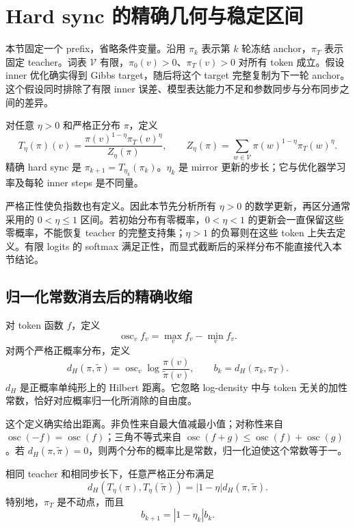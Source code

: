\section{Hard sync 的精确几何与稳定区间}
\label{sec:hard-sync-geometry}

本节固定一个 prefix，省略条件变量。沿用 $\pi_k$ 表示第 $k$ 轮冻结 anchor，$\pi_T$ 表示固定 teacher。词表 $\mathcal V$ 有限，$\pi_0(v)>0$、$\pi_T(v)>0$ 对所有 token 成立。假设 inner 优化确实得到 Gibbs target，随后将这个 target 完整复制为下一轮 anchor。这个假设同时排除了有限 inner 误差、模型表达能力不足和参数同步与分布同步之间的差异。

\begin{definition}
对任意 $\eta>0$ 和严格正分布 $\pi$，定义
\[
 T_\eta(\pi)(v)
 =\frac{\pi(v)^{1-\eta}\pi_T(v)^\eta}{Z_\eta(\pi)},
 \qquad
 Z_\eta(\pi)=\sum_{w\in\mathcal V}\pi(w)^{1-\eta}\pi_T(w)^\eta.
\]
精确 hard sync 是 $\pi_{k+1}=T_{\eta_k}(\pi_k)$。$\eta_k$ 是 mirror 更新的步长；它与优化器学习率及每轮 inner steps 是不同量。
\end{definition}

严格正性使负指数也有定义。因此本节先分析所有 $\eta>0$ 的数学更新，再区分通常采用的 $0<\eta\leq1$ 区间。若初始分布有零概率，$0<\eta<1$ 的更新会一直保留这些零概率，不能恢复 teacher 的完整支持集；$\eta>1$ 的负幂则在这些 token 上失去定义。有限 logits 的 softmax 满足正性，而显式截断后的采样分布不能直接代入本节结论。

\subsection{归一化常数消去后的精确收缩}

\begin{definition}
对 token 函数 $f$，定义
\[
 \operatorname{osc}_v f_v=\max_v f_v-\min_v f_v.
\]
对两个严格正概率分布，定义
\[
 d_H(\pi,\widetilde\pi)
 =\operatorname{osc}_v\log\frac{\pi(v)}{\widetilde\pi(v)},
 \qquad b_k=d_H(\pi_k,\pi_T).
\]
$d_H$ 是正概率单纯形上的 Hilbert 距离。它忽略 log-density 中与 token 无关的加性常数，恰好对应概率归一化所消除的自由度。
\end{definition}

这个定义确实给出距离。非负性来自最大值减最小值；对称性来自 $\operatorname{osc}(-f)=\operatorname{osc}(f)$；三角不等式来自 $\operatorname{osc}(f+g)\leq\operatorname{osc}(f)+\operatorname{osc}(g)$。若 $d_H(\pi,\widetilde\pi)=0$，则两个分布的概率比是常数，归一化迫使这个常数等于一。

\begin{theorem}
\label{thm:hs-pairwise-contraction}
相同 teacher 和相同步长下，任意严格正分布满足
\begin{equation}\label{eq:hs-pairwise-contraction}
 d_H(T_\eta(\pi),T_\eta(\widetilde\pi))
 =|1-\eta|d_H(\pi,\widetilde\pi).
\end{equation}
特别地，$\pi_T$ 是不动点，而且
\[
 b_{k+1}=|1-\eta_k|b_k.
\]
\end{theorem}

